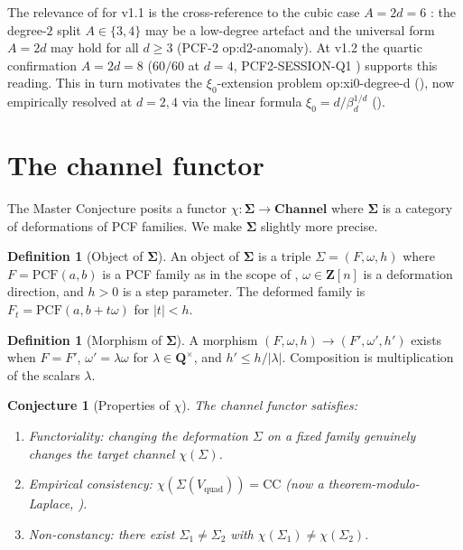 \documentclass[11pt,reqno]{amsart}
\theoremstyle{plain}
\newtheorem{conjecture}[theorem]{Conjecture}
\theoremstyle{definition}
\newtheorem{definition}[theorem]{Definition}
\theoremstyle{remark}
\newcommand{\Channel}{\mathbf{Channel}}
\newcommand{\Sigmaspace}{\mathbf{\Sigma}}
\newcommand{\PCF}{\mathrm{PCF}}
\newcommand{\CC}{\mathrm{CC}}
\newcommand{\Vquad}{V_{\mathrm{quad}}}
\begin{document}
The relevance of  for v1.1 is the
cross-reference to the cubic case
$A = 2d = 6$ \cite{siarc_pcf2_v11}: the degree-$2$ split
$A \in \{3, 4\}$ may be a low-degree artefact and the
universal form $A = 2d$ may hold for all $d \ge 3$ (PCF-2
\textsf{op:d2-anomaly}). At v1.2 the quartic confirmation
$A = 2d = 8$ ($60/60$ at $d=4$, PCF2-SESSION-Q1
\cite{siarc_pcf2_session_q1}) supports this reading. This in
turn motivates the $\xi_0$-extension problem
\textsf{op:xi0-degree-d} (), now empirically
resolved at $d=2,4$ via the linear formula
$\xi_0 = d / \beta_d^{1/d}$ ().

\section{The channel functor}
\label{sec:functor}

The Master Conjecture \cite{siarc_umbrella} posits a functor
$\chi : \Sigmaspace \to \Channel$ where $\Sigmaspace$ is a
category of deformations of PCF families. We make
$\Sigmaspace$ slightly more precise.

\begin{definition}[Object of $\Sigmaspace$]
An object of $\Sigmaspace$ is a triple
$\Sigma = (F, \omega, h)$ where $F = \PCF(a, b)$ is a PCF
family as in the scope of ,
$\omega \in \mathbf{Z}[n]$ is a deformation direction, and
$h > 0$ is a step parameter. The deformed family is
$F_t = \PCF(a, b + t \omega)$ for $|t| < h$.
\end{definition}

\begin{definition}[Morphism of $\Sigmaspace$]
A morphism
$(F, \omega, h) \to (F', \omega', h')$ exists when $F = F'$,
$\omega' = \lambda \omega$ for $\lambda \in \mathbf{Q}^\times$,
and $h' \le h / |\lambda|$. Composition is multiplication of
the scalars $\lambda$.
\end{definition}

\begin{conjecture}[Properties of $\chi$]
\label{conj:chi}
The channel functor satisfies:
\begin{enumerate}[label=(\roman*)]
\item Functoriality: changing the deformation $\Sigma$ on a
fixed family genuinely changes the target channel $\chi(\Sigma)$.
\item Empirical consistency:
$\chi(\Sigma(\Vquad)) = \CC$ (now a theorem-modulo-Laplace,
).
\item Non-constancy: there exist $\Sigma_1 \neq \Sigma_2$
with $\chi(\Sigma_1) \ne \chi(\Sigma_2)$.
\end{enumerate}
\end{conjecture}
\end{document}
